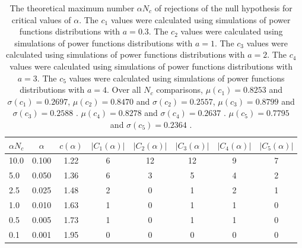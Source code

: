 \begin{table}[h!]
\begin{center}
\begin{tabular}{| l | c | c | c | c | c | c | c |}\hline
$\alpha N_c$ & $\alpha$ & $c(\alpha)$ & $|C_1(\alpha)|$ & $|C_2(\alpha)|$ & $|C_3(\alpha)|$ & $|C_4(\alpha)|$ & $|C_5(\alpha)|$ \\\hline\hline
10.0 & 0.100 & 1.22 & 6 & 12 & 12 & 9 & 7 \\\hline
5.0 & 0.050 & 1.36 & 6 & 3 & 5 & 4 & 2 \\\hline
2.5 & 0.025 & 1.48 & 2 & 0 & 1 & 2 & 1 \\\hline
1.0 & 0.010 & 1.63 & 1 & 0 & 1 & 1 & 0 \\\hline
0.5 & 0.005 & 1.73 & 1 & 0 & 1 & 1 & 0 \\\hline
0.1 & 0.001 & 1.95 & 0 & 0 & 0 & 0 & 0 \\\hline
\end{tabular}
\caption{The theoretical maximum number $\alpha N_c$ of rejections
of the null hypothesis for critical values of $\alpha$.
The $c_1$ values were calculated using simulations of power functions distributions with $a=0.3$.
The $c_2$ values were calculated using simulations of power functions distributions with $a=1$.
The $c_3$ values were calculated using simulations of power functions distributions with $a=2$.
The $c_4$ values were calculated using simulations of power functions distributions with $a=3$.
The $c_5$ values were calculated using simulations of power functions distributions with $a=4$.
Over all $N_c$ comparisons,
 $\mu(c_1)=0.8253$ and $\sigma(c_1)=0.2697$,
 $\mu(c_2)=0.8470$ and $\sigma(c_2)=0.2557$,
 $\mu(c_3)=0.8799$ and $\sigma(c_3)=0.2588$ .
 $\mu(c_4)=0.8278$ and $\sigma(c_4)=0.2637$ .
 $\mu(c_5)=0.7795$ and $\sigma(c_5)=0.2364$ .
}
\end{center}
\end{table}